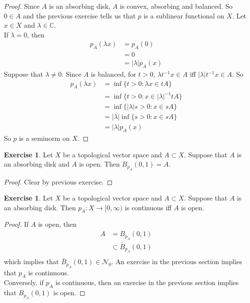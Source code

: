 \documentclass[12pt]{amsart}
\theoremstyle{definition}
\newtheorem{ex}[definition]{Exercise}
\newcommand{\lam}{\lambda}
\newcommand{\C}{\mathbb{C}}
\newcommand{\MN}{\mathcal{N}}
\newcommand{\Rg}{[0,\infty)}
\DeclareMathOperator*{\0}{\mbf{0}}
\DeclareMathOperator*{\1}{\mbf{1}}
\begin{document}
	\begin{proof} Since $A$ is an absorbing disk, $A$ is convex, absorbing and balanced. So $0 \in A$ and the previous exercise tells us that $p$ is a sublinear functional on $X$. Let $x\in X$ and $\lam \in \C$. \\
		If $\lam =0$, then 
				\begin{align*}
					p_A(\lam x) 
					&= p_A(0) \\
					&= 0 \\
					&= |\lam| p_A(x)
				\end{align*}
		Suppose that $\lam \neq 0$. Since $A$ is balanced, for $t >0$, $\lam t^{-1} x \in A$ iff $|\lam| t^{-1} x \in A$. So
				\begin{align*}
					p_A(\lam x) 
					&= \inf \{t > 0: \lam x \in tA\} \\
					&= \inf \{t > 0: x \in |\lam|^{-1} tA\} \\
					&= \inf \{|\lam| s > 0: x \in sA\} \\
					&= |\lam|\inf \{ s > 0: x \in sA\} \\
					&= |\lam | p_A(x)
				\end{align*}
	So $p$ is a seminorm on $X$.
	\end{proof}
	
	\begin{ex}
		Let $X$ be a topological vector space and $A \subset X$. Suppose that $A$ is an absorbing disk and $A$ is open. Then $B_{p_A}(0, 1) = A$.
	\end{ex}

	\begin{proof}
		Clear by previous exercise.
	\end{proof}

	\begin{ex}
		Let $X$ be a topological vector space and $A \subset X$. Suppose that $A$ is an absorbing disk. Then $p_A:X \rightarrow \Rg$ is continuous iff $A$ is open. 
	\end{ex}

	\begin{proof}
		If $A$ is open, then 
		\begin{align*}
			A 
			&= B_{p_A}(0,1) \\
			& \subset \bar{B}_{p_A}(0,1) \\
		\end{align*}
		which implies that $\bar{B}_{p_A}(0,1) \in \MN_0$. An exercise in the previous section implies that $p_A$ is continuous. \\
		Conversely, if $p_A$ is continuous, then an exercise in the previous section implies that $B_{p_A}(0,1)$ is open. 
	\end{proof}
	
\end{document}

